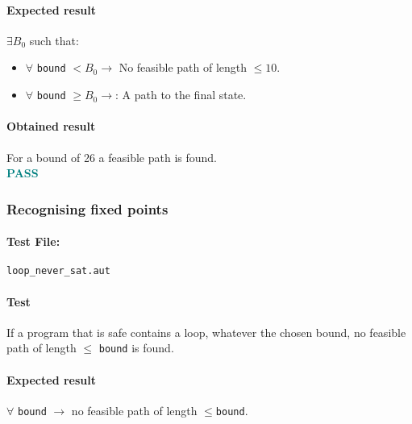 \documentclass[letterpaper,12pt]{article}
\begin{document}
\paragraph{Expected result}$\exists B_0$ such that:
\begin{itemize}
\item $\forall $ \texttt{bound} $< B_0 \rightarrow$ No feasible path of length $\leq 10$.
\item $\forall $ \texttt{bound} $\geq B_0 \rightarrow$: A path to the final state.
\end{itemize}

\paragraph{Obtained result}
For a bound of 26 a feasible path is found.\\
\textbf{\textcolor{teal}{PASS}}

\subsubsection{Recognising fixed points}
\paragraph{Test File:} \texttt{loop\_never\_sat.aut}

\paragraph{Test}
If a program that is safe contains a loop, whatever the chosen bound, no feasible path of length $\leq $ \texttt{bound} is found.


\paragraph{Expected result}
$\forall $ \texttt{bound} $\rightarrow$ no feasible path of length $\leq $\texttt{bound}.
\end{document}
